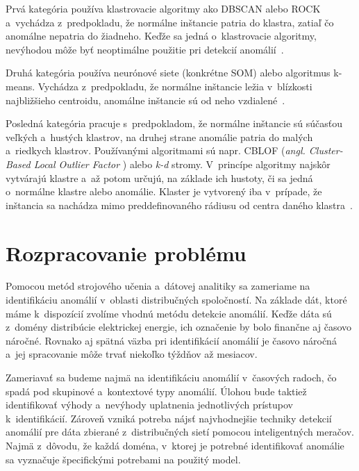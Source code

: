 \documentclass[a4paper,twoside,slovak,12pt]{article}
\begin{document}
Prvá kategória používa klastrovacie algoritmy ako DBSCAN alebo ROCK
a~vychádza z~predpokladu, že normálne inštancie patria do klastra, zatiaľ čo
anomálne nepatria do žiadneho. Keďže sa jedná o~klastrovacie algoritmy, nevýhodou
môže byť neoptimálne použitie pri detekcií anomálií~\cite{Chandola2009}.

Druhá kategória používa neurónové siete (konkrétne SOM) alebo algoritmus k-means.
Vychádza z~predpokladu, že normálne inštancie ležia v~blízkosti najbližšieho
centroidu, anomálne inštancie sú od neho vzdialené~\cite{Chandola2009}.

Posledná kategória pracuje s~predpokladom, že normálne inštancie sú súčasťou
veľkých a~hustých klastrov, na druhej strane anomálie patria do malých a~riedkych
klastrov. Používanými algoritmami sú napr. CBLOF (\textit{angl. Cluster-Based Local Outlier Factor}
) alebo \textit{k-d} stromy. V~princípe algoritmy najskôr vytvárajú klastre
a~až potom určujú, na základe ich hustoty, či sa jedná o~normálne klastre alebo
anomálie. Klaster je vytvorený iba v~prípade, že inštancia sa nachádza mimo
preddefinovaného rádiusu od centra daného klastra~\cite{Salvador2005}.



\section{Rozpracovanie problému}
Pomocou metód strojového učenia a~dátovej analitiky sa zameriame na identifikáciu
anomálií v~oblasti distribučných spoločností. Na základe dát, ktoré máme
k~dispozícií zvolíme vhodnú metódu detekcie anomálií. Keďže dáta sú z~domény
distribúcie elektrickej energie, ich označenie by bolo finančne aj časovo
náročné. Rovnako aj spätná väzba pri identifikácií anomálií je časovo náročná
a~jej spracovanie môže trvať niekoľko týždňov až mesiacov.

Zameriavať sa budeme najmä na identifikáciu anomálií v~časových radoch, čo spadá
pod skupinové a~kontextové typy anomálií. Úlohou bude taktiež identifikovať
výhody a~nevýhody uplatnenia jednotlivých prístupov k~identifikácií. Zároveň
vzniká potreba nájsť najvhodnejšie techniky detekcií anomálií pre dáta zbierané
z~distribučných sietí pomocou inteligentných meračov. Najmä z~dôvodu, že každá
doména, v~ktorej je potrebné identifikovať anomálie sa vyznačuje špecifickými
potrebami na použitý model.



\newpage


\end{document}
